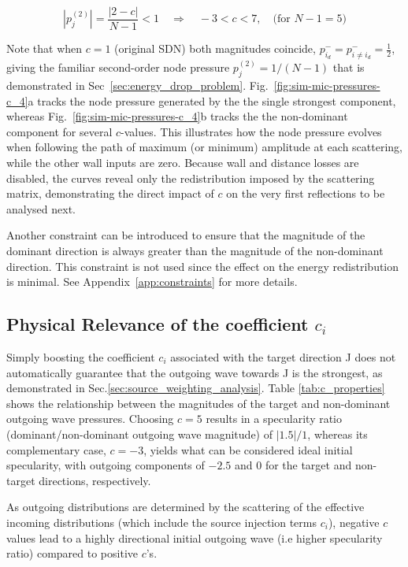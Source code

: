 \documentclass[journal]{IEEEtran}
\begin{document}
\begin{equation}
\label{constraint2}
|p^{(2)}_j| = \frac{\lvert 2-c\rvert}{N-1} < 1
\quad\Longrightarrow\quad
        -3 < c < 7,  \quad \text{(for } N - 1 = 5\text{)}
\end{equation}

Note that when $c=1$ (original SDN) both magnitudes coincide,
$p^-_{i_d}=p^-_{i\neq i_d}=\tfrac12$, giving the familiar
second-order node pressure $p^{(2)}_j={1}/{(N-1)}$ that is demonstrated in Sec~\ref{sec:energy_drop_problem}. Fig.~\ref{fig:sim-mic-pressures-c_4}a tracks the node pressure generated by the the single strongest component, whereas Fig.~\ref{fig:sim-mic-pressures-c_4}b tracks the the non-dominant component for several \( c\)-values. This illustrates how the node pressure evolves when following the path of maximum (or minimum) amplitude at each scattering, while the other wall inputs are zero. Because wall and distance losses are disabled, the curves reveal only the redistribution imposed by the scattering matrix, demonstrating the direct impact of \( c \) on the very first reflections to be analysed next.

Another constraint can be introduced to ensure that the magnitude of the dominant direction is always greater than the magnitude of the non-dominant direction. This constraint is not used since the effect on the energy redistribution is minimal. See Appendix~\ref{app:constraints} for more details.

\subsection{Physical Relevance of the coefficient $c_i$}
\label{sec:physical_relevance}

Simply boosting the coefficient \(c_i\) associated with the target direction J does not automatically guarantee that the outgoing wave towards J is the strongest, as demonstrated in Sec.\ref{sec:source_weighting_analysis}. 
Table \ref{tab:c_properties} shows the relationship between the magnitudes of the target and non-dominant outgoing wave pressures. Choosing $c=5$ results in a specularity ratio (dominant/non-dominant outgoing wave magnitude) of $|1.5|/1$, whereas its complementary case, $c=-3$, yields what can be considered ideal initial specularity, with outgoing components of $-2.5$ and $0$ for the target and non-target directions, respectively.

As outgoing distributions are determined by the scattering of the effective incoming distributions (which include the source injection terms $c_i$), negative $c$ values lead to a highly directional initial outgoing wave (i.e higher specularity ratio) compared to positive $c$'s.
\end{document}
